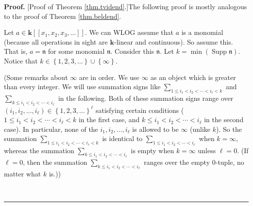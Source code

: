 \documentclass[numbers=enddot,12pt,final,onecolumn,notitlepage,abstracton]{scrartcl}%
\theoremstyle{definition}
\newenvironment{proof}[1][Proof]{\noindent\textbf{#1.} }{\ \rule{0.5em}{0.5em}}
\newenvironment{verlong}{}{}
\let\sumnonlimits\sum
\renewcommand{\sum}{\sumnonlimits\limits}
\begin{document}
\begin{verlong}
\begin{proof}
[Proof of Theorem \ref{thm.tvidend}.]The following proof is mostly analogous
to the proof of Theorem \ref{thm.beldend}.

Let $a\in\mathbf{k}\left[  \left[  x_{1},x_{2},x_{3},\ldots\right]  \right]
$. We can WLOG assume that $a$ is a monomial (because all operations in sight
are $\mathbf{k}$-linear and continuous). So assume this. That is,
$a=\mathfrak{n}$ for some monomial $\mathfrak{n}$. Consider this
$\mathfrak{n}$. Let $k=\min\left(  \operatorname*{Supp}\mathfrak{n}\right)  $.
Notice that $k\in\left\{  1,2,3,\ldots\right\}  \cup\left\{  \infty\right\}  $.

(Some remarks about $\infty$ are in order. We use $\infty$ as an object which
is greater than every integer. We will use summation signs like $\sum_{1\leq
i_{1}<i_{2}<\cdots<i_{\ell}<k}$ and $\sum_{k\leq i_{1}<i_{2}<\cdots<i_{\ell}}$
in the following. Both of these summation signs range over $\left(
i_{1},i_{2},\ldots,i_{\ell}\right)  \in\left\{  1,2,3,\ldots\right\}  ^{\ell}$
satisfying certain conditions ($1\leq i_{1}<i_{2}<\cdots<i_{\ell}<k$ in the
first case, and $k\leq i_{1}<i_{2}<\cdots<i_{\ell}$ in the second case). In
particular, none of the $i_{1},i_{2},\ldots,i_{\ell}$ is allowed to be
$\infty$ (unlike $k$). So the summation $\sum_{1\leq i_{1}<i_{2}%
<\cdots<i_{\ell}<k}$ is identical to $\sum_{1\leq i_{1}<i_{2}<\cdots<i_{\ell}%
}$ when $k=\infty$, whereas the summation $\sum_{k\leq i_{1}<i_{2}%
<\cdots<i_{\ell}}$ is empty when $k=\infty$ unless $\ell=0$. (If $\ell=0$,
then the summation $\sum_{k\leq i_{1}<i_{2}<\cdots<i_{\ell}}$ ranges over the
empty $0$-tuple, no matter what $k$ is.))


\end{proof}
\end{verlong}
\end{document}
